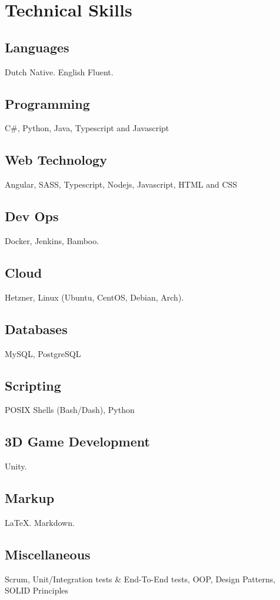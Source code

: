\section{Technical Ski\textcolor{mycolor}{lls}}
  \subsection{Languages} 
  Dutch \textcolor{mycolor}{Native}. English \textcolor{mycolor}{Fluent}.
  \subsection{Programming}
    C#, Python, Java, Typescript and Javascript
  \subsection{Web Technology}
    Angular, SASS, Typescript, Nodejs, Javascript, HTML and CSS
  \subsection{Dev Ops}
    Docker, Jenkins, Bamboo.
  \subsection{Cloud}
    Hetzner, Linux (Ubuntu, CentOS, Debian, Arch).
  \subsection{Databases}
    MySQL, PostgreSQL
  \subsection{Scripting}
    POSIX Shells (Bash/Dash), Python
  \subsection{3D Game Development}
    Unity.
  \subsection{Markup}
    {\LaTeX}. Markdown.
  \subsection{Miscellaneous}
    Scrum, Unit/Integration tests \& End-To-End tests, OOP, Design Patterns, SOLID Principles